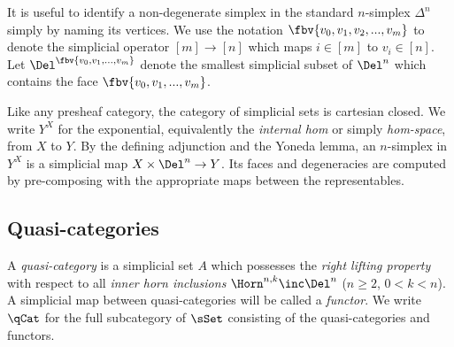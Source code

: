     \begin{ntn}\label{ntn:faces-by-vertices}
It is useful to identify a non-degenerate simplex in the standard $n$-simplex $\Delta^n$ simply by naming its vertices. We use the notation $\fbv{v_0,v_1,v_2,...,v_m}$ to denote the simplicial operator $[m]\to [n]$ which maps $i\in[m]$ to $v_i\in[n]$. Let $\Del^{\fbv{v_0,v_1,...,v_m}}$ denote the smallest simplicial subset of $\Del^n$ which contains the face $\fbv{v_0,v_1,...,v_m}$.

    \end{ntn}
    
    \begin{ntn}\label{ntn:simplicial-hom-space}
    Like any presheaf category, the category of simplicial sets is cartesian closed. We write $Y^X$ for the exponential, equivalently the {\em internal hom\/} or simply {\em hom-space}, from $X$ to $Y$. By the defining adjunction and the Yoneda lemma, an $n$-simplex in $Y^X$ is a simplicial map $X \times \Del^n \to Y$. Its faces and degeneracies are computed by pre-composing with the appropriate maps between the representables.
    \end{ntn}
    
    \subsection{Quasi-categories}

    \begin{defn}
      A {\em quasi-category} is a simplicial set $A$ which possesses the {\em right lifting property\/} with respect to all {\em inner horn inclusions\/} $\Horn^{n,k}\inc\Del^n$ ($n \geq 2$, $0<k<n$). A simplicial map between quasi-categories will be called a {\em functor}. We write $\qCat$ for the full subcategory of $\sSet$ consisting of the quasi-categories and functors.
    \end{defn}
    

